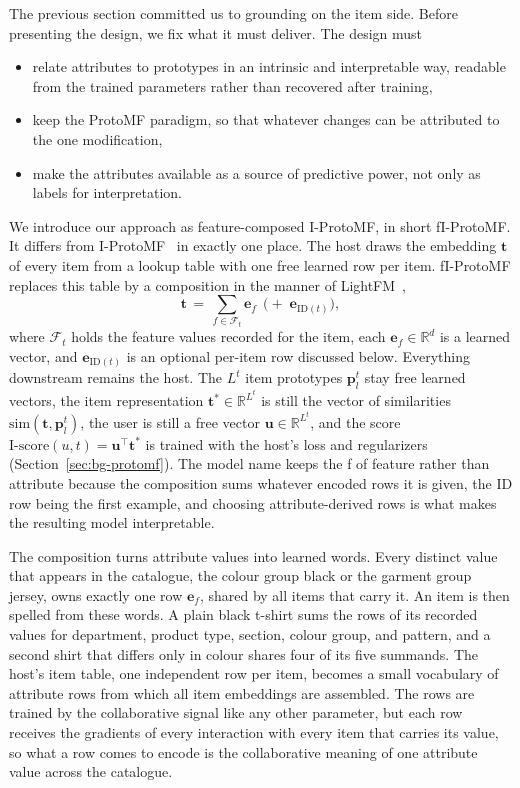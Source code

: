 The previous section committed us to grounding on the item side. Before
presenting the design, we fix what it must deliver. The design must
\begin{itemize}
\item relate attributes to prototypes in an intrinsic and interpretable
way, readable from the trained parameters rather than recovered after
training,
\item keep the ProtoMF paradigm, so that whatever changes can be
attributed to the one modification,
\item make the attributes available as a source of predictive power,
not only as labels for interpretation.
\end{itemize}

We introduce our approach as feature-composed I-ProtoMF, in short
fI-ProtoMF. It differs from I-ProtoMF~\cite{melchiorre2022protomf} in
exactly one place. The host draws the embedding $\mathbf{t}$ of every
item from a lookup table with one free learned row per item. fI-ProtoMF
replaces this table by a composition in the manner of
LightFM~\cite{kula2015lightfm},
\begin{equation}
\mathbf{t} \,=\, \sum_{f \in \mathcal{F}_t} \mathbf{e}_f
\;\,\bigl(+\; \mathbf{e}_{\mathrm{ID}(t)}\bigr),
\label{eq:fi-composition}
\end{equation}
where $\mathcal{F}_t$ holds the feature values recorded for the item,
each $\mathbf{e}_f \in \mathbb{R}^d$ is a learned vector, and
$\mathbf{e}_{\mathrm{ID}(t)}$ is an optional per-item row discussed
below. Everything downstream remains the host. The $L^t$ item prototypes
$\mathbf{p}^t_l$ stay free learned vectors, the item representation
$\mathbf{t}^* \in \mathbb{R}^{L^t}$ is still the vector of similarities
$\mathrm{sim}(\mathbf{t}, \mathbf{p}^t_l)$, the user is still a free
vector $\mathbf{u} \in \mathbb{R}^{L^t}$, and the score
$\text{I-score}(u,t) = \mathbf{u}^\top \mathbf{t}^*$ is trained with the
host's loss and regularizers (Section~\ref{sec:bg-protomf}). The model
name keeps the f of feature rather than attribute because the
composition sums whatever encoded rows it is given, the ID row being the
first example, and choosing attribute-derived rows is what makes the
resulting model interpretable.

The composition turns attribute values into learned words. Every
distinct value that appears in the catalogue, the colour group black or
the garment group jersey, owns exactly one row $\mathbf{e}_f$, shared by
all items that carry it. An item is then spelled from these words. A
plain black t-shirt sums the rows of its recorded values for department,
product type, section, colour group, and pattern, and a second shirt
that differs only in colour shares four of its five summands. The host's
item table, one independent row per item, becomes a small vocabulary of
attribute rows from which all item embeddings are assembled. The rows
are trained by the collaborative signal like any other parameter, but
each row receives the gradients of every interaction with every item
that carries its value, so what a row comes to encode is the
collaborative meaning of one attribute value across the catalogue.

